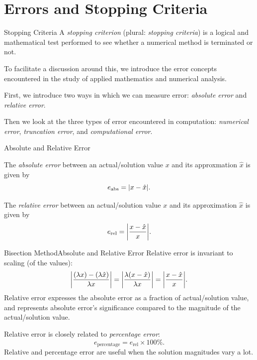 \documentclass[12pt,aspectratio=169,envcountset]{beamer}
\DeclarePairedDelimiter{\abs}{\lvert}{\rvert}
\begin{document}
\section{Errors and Stopping Criteria}
\begin{frame}{Stopping Criteria} \label{fr:stopping-criteria}
  A \emph{stopping criterion} (plural: \emph{stopping criteria}) is a logical
  and mathematical test performed to see whether a numerical method is
  terminated or not.

  To facilitate a discussion around this, we introduce the error concepts
  encountered in the study of applied mathematics and numerical analysis.

  First, we introduce two ways in which we can measure error: \emph{absolute
  error} and \emph{relative error}.

  Then we look at the three types of error encountered in computation:
  \emph{numerical error}, \emph{truncation error}, and \emph{computational
  error}.
\end{frame}

\begin{frame}{Absolute and Relative Error} \label{fr:abs-rel-error}
  \begin{definition}
    The \emph{absolute error} between an actual/solution value $x$ and its
    approxmation $\hat{x}$ is given by
    \begin{equation} \label{eq:abs-error}
      e_\text{abs} = \abs{x - \hat{x}}.
    \end{equation}
  \end{definition}
  \begin{definition}
    The \emph{relative error} between an actual/solution value $x$ and its
    approximation $\hat{x}$ is given by
    \begin{equation} \label{eq:rel-error}
      e_\text{rel} = \abs*{\frac{x - \hat{x}}{x}}.
    \end{equation}
  \end{definition}
\end{frame}

\begin{frame}{Bisection Method}{Absolute and Relative Error}
  Relative error is invariant to scaling (of the values):
  \[
    \abs*{\frac{(\lambda x) - (\lambda \hat{x})}{\lambda x}}
    = \abs*{\frac{\lambda (x - \hat{x})}{\lambda x}}
    = \abs*{\frac{x - \hat{x}}{x}}.
  \]
  Relative error expresses the absolute error as a fraction of actual/solution
  value, and represents absolute error's significance compared to the magnitude
  of the actual/solution value.

  Relative error is closely related to \emph{percentage error}:
  \[
    e_{\text{percentage}} = e_{\text{rel}} \times 100\%.
  \]
  Relative and percentage error are useful when the solution magnitudes vary a
  lot.
\end{frame}
\end{document}

